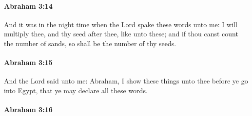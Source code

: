 		\paragraph{Abraham 3:14} %
			\label{ABRAHAM-3-14}

			And it was in the night time when the Lord spake these words unto me: I will multiply thee, and thy seed after thee, like unto these; and if thou canst count the number of sands, so shall be the number of thy seeds.


		\paragraph{Abraham 3:15} %
			\label{ABRAHAM-3-15}

			And the Lord said unto me: Abraham, I show these things unto thee before ye go into Egypt, that ye may declare all these words.


		\paragraph{Abraham 3:16} %
			\label{ABRAHAM-3-16}

